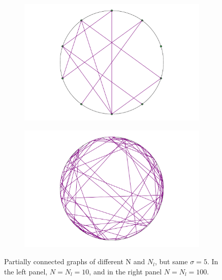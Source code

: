 \documentclass[a4paper]{article}
\begin{document}
\begin{figure}[t]
	\begin{subfigure}{0.5\textwidth}
	\centering
	\includegraphics[width=\textwidth]{figures/partially-connected-graph.pdf}
\end{subfigure}
	\begin{subfigure}{0.5\textwidth}
	\centering
	\includegraphics[width=\textwidth]{figures/partially-connected-graph-many-points-nPoints-100-nBonds-100-sigma-5.pdf}
\end{subfigure}
	\caption{Partially connected graphs of different N and $N_l$, but same $\sigma=5$. In the left panel, $N=N_l=10$, and in the right panel $N=N_l=100$.}
	\label{fig:a-partially-connected-graph}
\end{figure}
\end{document}
